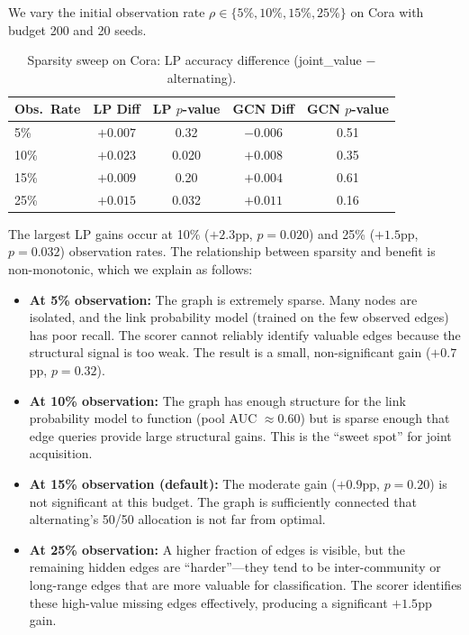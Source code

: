 \documentclass[12pt,a4paper,oneside]{report}
\begin{document}
We vary the initial observation rate $\rho \in \{5\%, 10\%, 15\%, 25\%\}$ on Cora with budget 200 and 20 seeds.

\begin{table}[htbp]
\centering
\caption{Sparsity sweep on Cora: LP accuracy difference (joint\_value $-$ alternating).}
\label{tab:sparsity}
\small
\begin{tabular}{lcccc}
\toprule
Obs.\ Rate & LP Diff & LP $p$-value & GCN Diff & GCN $p$-value \\
\midrule
5\%  & $+0.007$ & 0.32 & $-0.006$ & 0.51 \\
10\% & $+0.023$ & 0.020 & $+0.008$ & 0.35 \\
15\% & $+0.009$ & 0.20 & $+0.004$ & 0.61 \\
25\% & $+0.015$ & 0.032 & $+0.011$ & 0.16 \\
\bottomrule
\end{tabular}
\end{table}

The largest LP gains occur at 10\% ($+2.3$pp, $p = 0.020$) and 25\% ($+1.5$pp, $p = 0.032$) observation rates. The relationship between sparsity and benefit is non-monotonic, which we explain as follows:

\begin{itemize}[leftmargin=2em]
    \item \textbf{At 5\% observation:} The graph is extremely sparse. Many nodes are isolated, and the link probability model (trained on the few observed edges) has poor recall. The scorer cannot reliably identify valuable edges because the structural signal is too weak. The result is a small, non-significant gain ($+0.7$pp, $p = 0.32$).
    \item \textbf{At 10\% observation:} The graph has enough structure for the link probability model to function (pool AUC $\approx 0.60$) but is sparse enough that edge queries provide large structural gains. This is the ``sweet spot'' for joint acquisition.
    \item \textbf{At 15\% observation (default):} The moderate gain ($+0.9$pp, $p = 0.20$) is not significant at this budget. The graph is sufficiently connected that alternating's 50/50 allocation is not far from optimal.
    \item \textbf{At 25\% observation:} A higher fraction of edges is visible, but the remaining hidden edges are ``harder''---they tend to be inter-community or long-range edges that are more valuable for classification. The scorer identifies these high-value missing edges effectively, producing a significant $+1.5$pp gain.
\end{itemize}
\end{document}
